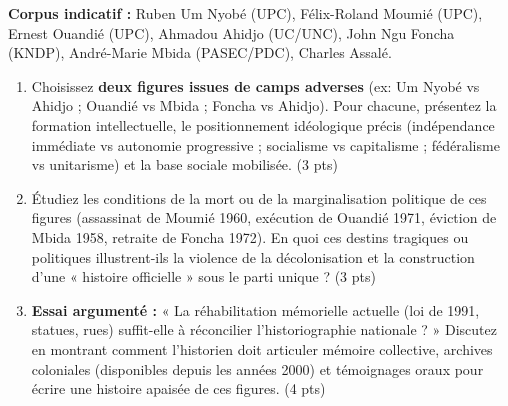 \documentclass[11pt]{article}
\begin{document}
\begin{exercice}
\textbf{Corpus indicatif :} Ruben Um Nyobé (UPC), Félix-Roland Moumié (UPC), Ernest Ouandié (UPC), Ahmadou Ahidjo (UC/UNC), John Ngu Foncha (KNDP), André-Marie Mbida (PASEC/PDC), Charles Assalé.
\begin{enumerate}
    \item Choisissez \textbf{deux figures issues de camps adverses} (ex: Um Nyobé vs Ahidjo ; Ouandié vs Mbida ; Foncha vs Ahidjo). Pour chacune, présentez la formation intellectuelle, le positionnement idéologique précis (indépendance immédiate vs autonomie progressive ; socialisme vs capitalisme ; fédéralisme vs unitarisme) et la base sociale mobilisée. (3 pts)
    \item Étudiez les conditions de la mort ou de la marginalisation politique de ces figures (assassinat de Moumié 1960, exécution de Ouandié 1971, éviction de Mbida 1958, retraite de Foncha 1972). En quoi ces destins tragiques ou politiques illustrent-ils la violence de la décolonisation et la construction d'une « histoire officielle » sous le parti unique ? (3 pts)
    \item \textbf{Essai argumenté :} « La réhabilitation mémorielle actuelle (loi de 1991, statues, rues) suffit-elle à réconcilier l'historiographie nationale ? » Discutez en montrant comment l'historien doit articuler mémoire collective, archives coloniales (disponibles depuis les années 2000) et témoignages oraux pour écrire une histoire apaisée de ces figures. (4 pts)
\end{enumerate}
\end{exercice}
\end{document}
